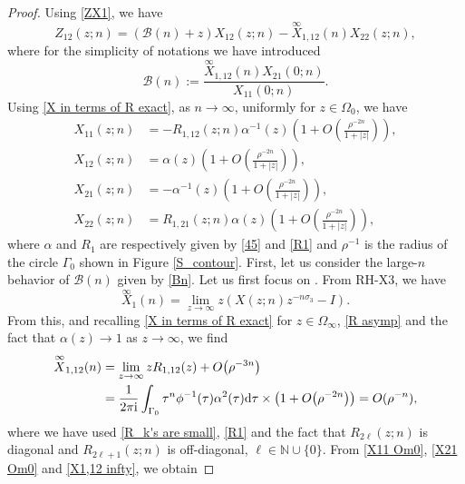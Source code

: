 \documentclass[10pt,a4paper]{amsart}
\numberwithin{equation}{section}
\newcommand{\N}{{\mathbb N}}
\newcommand{\al}{\alpha}
\newcommand{\Ga}{\Gamma}
\newcommand{\Om}{\Omega}
\newcommand{\ii}{{\rm i}}
\newcommand{\dd}{{\rm d}}
\begin{document}
		\begin{proof}
			Using \eqref{ZX1}, we have
			\begin{equation}\label{Z12}
				Z_{12}(z;n) = (\mathscr{B}(n)+z) X_{12}(z;n) -\overset{\infty}{X}_{1,12}(n) X_{22}(z;n),
			\end{equation}
			where for the simplicity of notations we have introduced
			\begin{equation}\label{Bn}
				\mathscr{B}(n) := \frac{\overset{\infty}{X}_{1,12}(n)X_{21}(0;n)}{X_{11}(0;n)}.
			\end{equation}
			Using \eqref{X in terms of R exact}, as $n \to \infty$, uniformly for $z\in \Om_0$, we have
			\begin{align}
				X_{11}(z;n) & = - R_{1,12}(z;n) \al^{-1}(z) \left( 1 + O \left( \frac{\rho^{-2n}}{1+|z|} \right) \right), \label{X11 Om0} \\
				X_{12}(z;n) & = \al(z) \left( 1 + O \left( \frac{\rho^{-2n}}{1+|z|} \right) \right), \nonumber \\
				X_{21}(z;n) & = - \al^{-1}(z) \left( 1 + O \left( \frac{\rho^{-2n}}{1+|z|} \right) \right), \label{X21 Om0}\\
				X_{22}(z;n) & = R_{1,21}(z;n) \al(z) \left( 1 + O \left( \frac{\rho^{-2n}}{1+|z|} \right) \right), \label{X22 Om0}
			\end{align}
			where $\al$ and $R_1$ are respectively given by \eqref{45} and \eqref{R1} and $\rho^{-1}$ is the radius of the circle $\Ga_0$ shown in Figure \ref{S_contour}. First, let us consider the large-$n$ behavior of $\mathscr{B}(n)$ given by \eqref{Bn}. Let us first focus on . From {\rm RH-X3}, we have
			\begin{equation*}
				\overset{\infty}{X}_{1}(n) = \lim_{z \to \infty} z( X(z;n)z^{-n\sigma_3} - I ).
			\end{equation*}
			From this, and recalling \eqref{X in terms of R exact} for $z \in \Om_{\infty}$, \eqref{R asymp} and the fact that $\al(z) \to 1$ as $z \to \infty$, we find
			\begin{align}
				\overset{\infty}{X}_{1,12}(n) &= \lim_{z \to \infty} z R_{1,12}(z) + O\big(\rho^{-3n}\big) \nonumber\\
&= \frac{1}{2 \pi \ii} \int_{\Ga_0} \tau^n \phi^{-1}(\tau) \al^2(\tau) \dd \tau \times \big(1 + O\big(\rho^{-2n}\big)\big) = O(\rho^{-n}),\label{X1,12 infty}
			\end{align}
			where we have used \eqref{R_k's are small}, \eqref{R1} and the fact that $R_{2\ell}(z;n)$ is diagonal and $R_{2\ell+1}(z;n)$ is off-diagonal, $\ell \in \N \cup \{0\}$. From \eqref{X11 Om0}, \eqref{X21 Om0} and \eqref{X1,12 infty}, we obtain

\end{proof}
\end{document}
